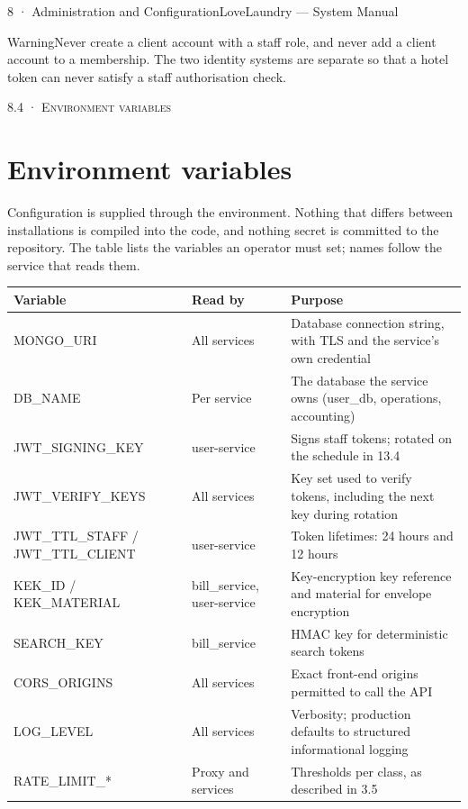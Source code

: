 \documentclass[11pt,a4paper,oneside]{book}
\begin{document}
8 · Administration and ConfigurationLoveLaundry — System Manual

\begin{notebox}WarningNever create a client account with a staff role, and never add a client account to a membership. The two identity systems are separate so that a hotel token can never satisfy a staff authorisation check.\end{notebox}
\textsc{\small\color{crimson}8.4 · Environment variables}\par\medskip
\section*{Environment variables}
Configuration is supplied through the environment. Nothing that differs between installations is compiled into the code, and nothing secret is committed to the repository. The table lists the variables an operator must set; names follow the service that reads them.

\begin{center}\small
\begin{tabularx}{\linewidth}{|X|X|X|}
\hline
\rowcolor{lightgrey}
\textbf{Variable} & \textbf{Read by} & \textbf{Purpose} \\ \hline
MONGO\_URI & All services & Database connection string, with TLS and the service's own credential \\ \hline
DB\_NAME & Per service & The database the service owns (user\_db, operations, accounting) \\ \hline
JWT\_SIGNING\_KEY & user-service & Signs staff tokens; rotated on the schedule in 13.4 \\ \hline
JWT\_VERIFY\_KEYS & All services & Key set used to verify tokens, including the next key during rotation \\ \hline
JWT\_TTL\_STAFF / JWT\_TTL\_CLIENT & user-service & Token lifetimes: 24 hours and 12 hours \\ \hline
KEK\_ID / KEK\_MATERIAL & bill\_service, user-service & Key-encryption key reference and material for envelope encryption \\ \hline
SEARCH\_KEY & bill\_service & HMAC key for deterministic search tokens \\ \hline
CORS\_ORIGINS & All services & Exact front-end origins permitted to call the API \\ \hline
LOG\_LEVEL & All services & Verbosity; production defaults to structured informational logging \\ \hline
RATE\_LIMIT\_* & Proxy and services & Thresholds per class, as described in 3.5 \\ \hline
\end{tabularx}
\end{center}
\end{document}

